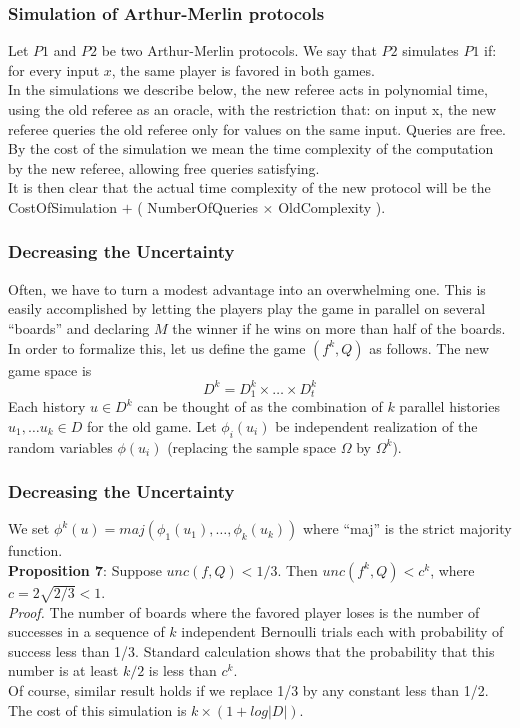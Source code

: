 \documentclass{beamer}
\begin{document}
\begin{frame}
\frametitle{Simulation of Arthur-Merlin protocols}
Let $P1$ and $P2$ be two Arthur-Merlin protocols. We say that $P2$ simulates $P1$ if: for every input $x$, the same player is favored in both games.\\
In the simulations we describe below, the new referee acts in polynomial time, using the old referee as an oracle, with the restriction that: on input x, the new referee queries the old referee only for values on the same input. Queries are free. By the cost of the simulation we mean the time complexity of the computation by the new referee, allowing free queries satisfying.\\
It is then clear that the actual time complexity of the new protocol will be the CostOfSimulation $+$ ( NumberOfQueries $\times$ OldComplexity ).
\end{frame}

\begin{frame}
\frametitle{Decreasing the Uncertainty}
Often, we have to turn a modest advantage into an overwhelming one. This is easily accomplished by letting the players play the game in parallel on several ``boards'' and declaring $M$ the winner if he wins on more than half of the boards.\\
In order to formalize this, let us define the game $(f^k, Q)$ as follows. The new game space is $$D^k = D_1^k \times \dots \times D_t^k$$
Each history $u \in D^k$ can be thought of as the combination of $k$ parallel histories $u_1, \ldots u_k \in D$ for the old game. Let $\phi_i(u_i)$ be independent realization of the random variables $\phi(u_i)$ (replacing the sample space $\Omega$ by $\Omega^k$). 
\end{frame}

\begin{frame}
\frametitle{Decreasing the Uncertainty}
We set $\phi^k(u) = maj(\phi_1(u_1),\ldots,\phi_k(u_k))$ where ``maj'' is the strict majority function.\\
\textbf{Proposition 7}: Suppose $unc(f, Q) < 1/3$. Then $unc(f^k, Q) < c^k$, where $c=2\sqrt{2/3} < 1$.\\
\textit{Proof.} The number of boards where the favored player loses is the number of successes in a sequence of $k$ independent Bernoulli trials each with probability of success less than 1/3. Standard calculation shows that the probability that this number is at least $k/2$ is less than $c^k$.\\
Of course, similar result holds if we replace 1/3 by any constant less than 1/2. The cost of this simulation is $k \times (1 + log |D|)$.
\end{frame}
\end{document}
